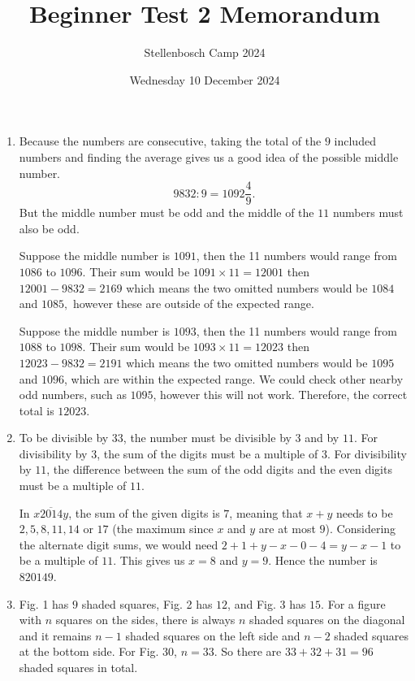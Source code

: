 \documentclass[12pt]{article}
\title{Beginner Test 2 Memorandum}
\author{Stellenbosch Camp 2024}
\date{Wednesday 10 December 2024}
\begin{document}
 \maketitle

\begin{enumerate}[topsep=\bigskipamount,itemsep=\bigskipamount]

\item Because the numbers are consecutive, taking the total of the $9$ included numbers and finding the average gives us a good idea of the possible middle number.
\[ 9832 : 9=1092 \frac{4}{9}. \]
But the middle number must be odd and the middle of the $11$ numbers must also be odd.

Suppose the middle number is $1091$, then the 11 numbers would range from $1086$ to $1096$. Their sum would be $1091 \times 11 = 12001$ then $12001 - 9832 = 2169$ which means the two omitted numbers would be $1084$ and $1085,$ however these are outside of the expected range.

Suppose the middle number is $1093$, then the 11 numbers would range from $1088$ to $1098$. Their sum would be $1093 \times 11 = 12023$ then $12023 - 9832 = 2191$ which means the two omitted numbers would be $1095$ and $1096$, which are within the expected range.
We could check other nearby odd numbers, such as $1095$, however this will not work. Therefore, the correct total is $12023$.

\item To be divisible by $33$, the number must be divisible by $3$ and by $11$.
For divisibility by $3$, the sum of the digits must be a multiple of $3$.
For divisibility by $11$, the difference between the sum of the odd digits and the even digits must be a multiple of $11$.

In $\overline{x2014y}$, the sum of the given digits is $7$, meaning that $x+y$ needs to be $2, 5, 8, 11, 14$ or $17$ (the maximum since $x$ and $y$ are at most $9$).
Considering the alternate digit sums, we would need $2+1+y-x-0-4 = y-x-1$ to be a multiple of $11$.
This gives us $x=8$ and $y=9$. 
Hence the number is $820149$.

\item Fig. 1 has $9$ shaded squares, Fig. 2 has $12$, and Fig. 3 has $15$. For a figure with $n$ squares on the sides, there is always $n$ shaded squares on the diagonal and it remains $n-1$ shaded squares on the left side and $n-2$ shaded squares at the bottom side. For Fig. 30, $n=33$. So there are $33+32+31 = 96$ shaded squares in total.


\end{enumerate}
\end{document}
